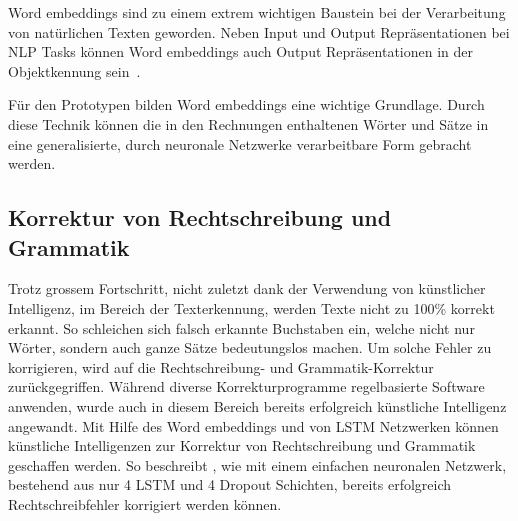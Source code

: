 Word embeddings sind zu einem extrem wichtigen Baustein bei der Verarbeitung von natürlichen Texten geworden. Neben Input und Output Repräsentationen bei NLP Tasks können Word embeddings auch Output Repräsentationen in der Objektkennung sein~\autocite{Olah2014b}. 

Für den Prototypen bilden Word embeddings eine wichtige Grundlage. Durch diese Technik können die in den Rechnungen enthaltenen Wörter und Sätze in eine generalisierte, durch neuronale Netzwerke verarbeitbare Form gebracht werden.

\subsection{Korrektur von Rechtschreibung und Grammatik}
\label{chap:grammar-correction}

Trotz grossem Fortschritt, nicht zuletzt dank der Verwendung von künstlicher Intelligenz, im Bereich der Texterkennung, werden Texte nicht zu 100\% korrekt erkannt. So schleichen sich falsch erkannte Buchstaben ein, welche nicht nur Wörter, sondern auch ganze Sätze bedeutungslos machen. Um solche Fehler zu korrigieren, wird auf die Rechtschreibung- und Grammatik-Korrektur zurückgegriffen. Während diverse Korrekturprogramme regelbasierte Software anwenden, wurde auch in diesem Bereich bereits erfolgreich künstliche Intelligenz angewandt. Mit Hilfe des Word embeddings und von LSTM Netzwerken können künstliche Intelligenzen zur Korrektur von Rechtschreibung und Grammatik geschaffen werden. So beschreibt \textcite{Weiss2016}, wie mit einem einfachen neuronalen Netzwerk, bestehend aus nur 4 LSTM und 4 Dropout Schichten, bereits erfolgreich Rechtschreibfehler korrigiert werden können. 

